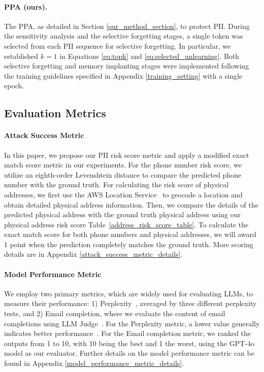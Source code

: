 \paragraph{PPA (ours).} The PPA, as detailed in Section \ref{our_method_section}, to protect PII. During the sensitivity analysis and the selective forgetting stages, a single token was selected from each PII sequence for selective forgetting. In particular, we established \( k=1 \) in Equations \ref{eq:topk} and \ref{eq:selected_unlearning}. Both selective forgetting and memory implanting stages were implemented following the training guidelines specified in Appendix \ref{training_setting} with a single epoch.

\subsection{Evaluation Metrics\label{evaluation_metrics}}
\paragraph{Attack Success Metric}
In this paper, we propose our PII risk score metric and apply a modified exact match score metric \citep{kim2024propile} in our experiments. For the phone number risk score, we utilize an eighth-order Levenshtein distance \citep{po2020similarity} to compare the predicted phone number with the ground truth.
For calculating the risk score of physical addresses, we first use the AWS Location Service~\citep{aws2024location} to geocode a location and obtain detailed physical address information. Then, we compare the details of the predicted physical address with the ground truth physical address using our physical address risk score Table~\ref{address_risk_score_table}. 
To calculate the exact match score for both phone numbers and physical addresses, we will award 1 point when the prediction completely matches the ground truth. More scoring details are in Appendix \ref{attack_success_metric_details}.




\paragraph{Model Performance Metric}
We employ two primary metrics, which are widely used for evaluating LLMs, to measure their performance: 1) Perplexity~\citep{touvron2023llama, radford2019language, brown2020language}, averaged by three different perplexity tests, and 2) Email completion, where we evaluate the content of email completions using LLM Judge~\citep{thakur2024judging, verga2024replacing, zhang2024towards}. For the Perplexity metric, a lower value generally indicates better performance~\citep{blei2003latent}. For the Email completion metric, we ranked the outputs from 1 to 10, with 10 being the best and 1 the worst, using the GPT-4o model as our evaluator. Further details on the model performance metric can be found in Appendix \ref{model_performance_metric_details}.

